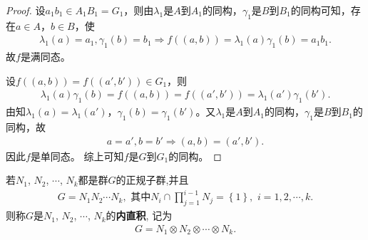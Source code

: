 \documentclass[../../main.tex]{subfiles}%
\begin{document}
\begin{proof}
设$a_1b_1\in A_1B_1=G_1$，则由$\lambda_1$是$A$到$A_1$的同构，$\gamma_1$是$B$到$B_1$的同构可知，存在$a\in A$，$b\in B$，使
\begin{align*}
\lambda_1(a)=a_1,\gamma_1(b)=b_1\Longrightarrow f((a,b))=\lambda_1(a)\gamma_1(b)=a_1b_1.
\end{align*}
故$f$是满同态。

设$f((a,b))=f((a',b'))\in G_1$，则
\begin{align*}
\lambda_1(a)\gamma_1(b)=f((a,b))=f((a',b'))=\lambda_1(a')\gamma_1(b').
\end{align*}
由知$\lambda_1(a)=\lambda_1(a')$，$\gamma_1(b)=\gamma_1(b')$。又$\lambda_1$是$A$到$A_1$的同构，$\gamma_1$是$B$到$B_1$的同构，故
\begin{align*}
a=a',b=b'\Longrightarrow (a,b)=(a',b').
\end{align*}
因此$f$是单同态。
综上可知$f$是$G$到$G_1$的同构。

\end{proof}

\begin{definition}
若$N_1$, $N_2$, $\cdots$, $N_k$都是群$G$的正规子群,并且
\begin{align*}
G = N_1N_2\cdots N_k,\,\,\text{其中}N_i\cap \prod_{j=1}^{i-1}{N_j}=\left\{ 1 \right\} ,\,\,i=1,2,\cdots ,k.
\end{align*}
则称$G$是$N_1$, $N_2$, $\cdots$, $N_k$的\textbf{内直积}, 记为
\begin{align*}
G = N_1\otimes N_2\otimes\cdots\otimes N_k.
\end{align*}
\end{definition}
\end{document}
